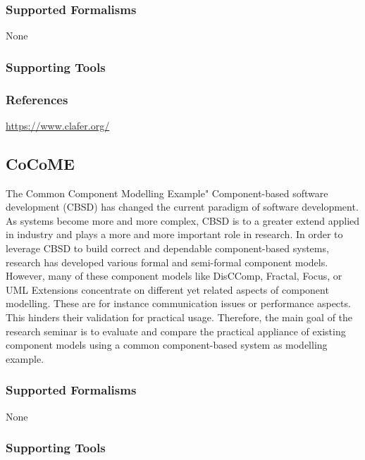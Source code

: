 \subsubsection{Supported Formalisms}

None


\subsubsection{Supporting Tools}


\subsubsection{References}

\url{https://www.clafer.org/}



\subsection{CoCoME}
\label{subsecL:CoCoME}


The Common Component Modelling Example"
Component-based software development (CBSD) has changed the current paradigm of software development. As systems become more and more complex, CBSD is to a greater extend applied in industry and plays a more and more important role in research. 
In order to leverage CBSD to build correct and dependable component-based systems, research has developed various formal and semi-formal component models. However, many of these component models like DisCComp, Fractal, Focus, or UML Extensions concentrate on different yet related aspects of component modelling. These are for instance communication issues or performance aspects. This hinders their validation for practical usage. 
Therefore, the main goal of the research seminar is to evaluate and compare the practical appliance of existing component models using a common component-based system as modelling example.

\subsubsection{Supported Formalisms}

None


\subsubsection{Supporting Tools}

